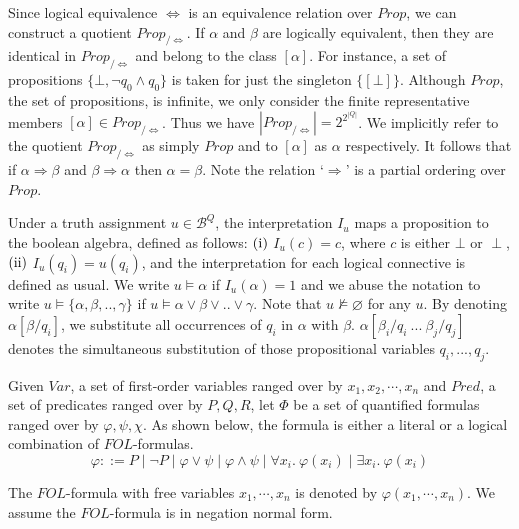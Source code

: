 Since logical equivalence \( \Leftrightarrow \) is an equivalence relation over
\( \mathit{Prop} \), we can construct a quotient \(
\mathit{Prop}_{/\Leftrightarrow} \). If \( \alpha \) and \( \beta \) are
logically equivalent, then they are identical in \(
\mathit{Prop}_{/\Leftrightarrow} \) and belong to the class \( [\alpha] \). For
instance, a set of propositions \( \{ \bot, \neg q_0 \wedge q_0 \} \) is taken for
just the singleton \( \{ [\bot] \} \). Although \( \mathit{Prop} \), the set of
propositions, is infinite, we only consider the finite representative members \(
[\alpha] \in \mathit{Prop}_{/\Leftrightarrow} \). Thus we have \(
|\mathit{Prop}_{/\Leftrightarrow}| = 2^{2^{|Q|}} \). We implicitly refer to the
quotient \( \mathit{Prop}_{/\Leftrightarrow} \) as simply \( \mathit{Prop} \)
and to \( [\alpha] \) as \( \alpha \) respectively.  It follows that if \(
\alpha \Rightarrow \beta \) and \( \beta \Rightarrow \alpha \) then \( \alpha =
\beta \). Note the relation `\( \Rightarrow \)' is a partial ordering over \(
\mathit{Prop} \).

Under a truth assignment \( u \in \mathcal{B}^Q \), the interpretation \( I_u \)
maps a proposition to the boolean algebra, defined as follows: \( (\rm i) \) \(
I_u(c) = c \), where \( c \) is either \( \bot \) or \( \perp \), \( (\rm ii) \)
\( I_u(q_i) = u(q_i) \), and the interpretation for each logical connective is
defined as usual. We write \( u \models \alpha \) if \( I_u(\alpha) = 1 \) and
we abuse the notation to write \( u \models \{\alpha, \beta, .., \gamma \} \) if
\( u \models \alpha \vee \beta \vee ..\vee \gamma \). Note that \( u \not\models
\varnothing \) for any \( u \). By denoting \( \alpha[\beta/q_i] \), we
substitute all occurrences of \( q_i \) in \( \alpha \) with \( \beta \). \(
\alpha[\beta_i/q_i \ ...\ \beta_j/q_j] \) denotes the simultaneous substitution
of those propositional variables \( q_i, ..., q_j \).

Given \( \mathit{Var} \), a set of first-order variables ranged over by \( x_1,
x_2, \cdots, x_n \) and \( \mathit{Pred} \), a set of predicates ranged over by
\( P, Q, R \), let \( \Phi \) be a set of quantified formulas ranged over by \(
\varphi, \psi, \chi \). As shown below, the formula is either a literal or a
logical combination of \( \mathit{FOL} \)-formulas.
\[
  \varphi ::= P \mid \neg P
  \mid \varphi \vee \psi \mid \varphi \wedge \psi
  \mid \forall x_i .\ \varphi(x_i) \mid \exists x_i .\ \varphi(x_i) 
\]

The \( \mathit{FOL} \)-formula with free variables \( x_1, \cdots, x_n \) is
denoted by \( \varphi(x_1, \cdots, x_n) \). We assume the \( \mathit{FOL}
\)-formula is in negation normal form.
